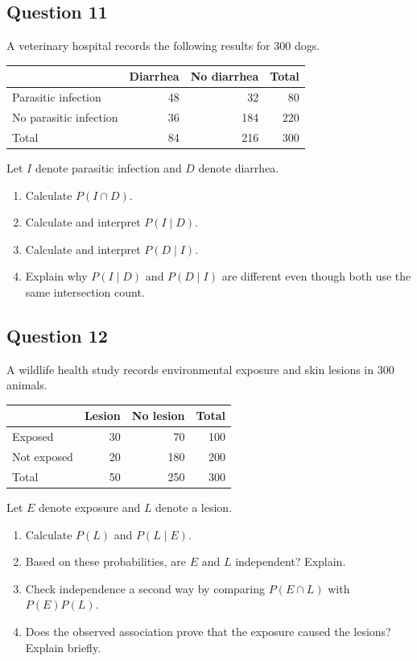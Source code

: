 \documentclass[10pt,letterpaper]{article}
\newcommand{\questionheading}[1]{%
  \subsection*{Question #1}
}
\begin{document}
\questionheading{11}
A veterinary hospital records the following results for 300 dogs.
\begin{center}
\begin{tabular}{lrrr}
\toprule
	& Diarrhea & No diarrhea & Total \\
\midrule
Parasitic infection & 48 & 32 & 80 \\
No parasitic infection & 36 & 184 & 220 \\
\midrule
Total & 84 & 216 & 300 \\
\bottomrule
\end{tabular}
\end{center}

Let $I$ denote parasitic infection and $D$ denote diarrhea.
\begin{enumerate}
	\item Calculate $P(I\cap D)$.	
	\item Calculate and interpret $P(I\mid D)$.
	\item Calculate and interpret $P(D\mid I)$.
	\item Explain why $P(I\mid D)$ and $P(D\mid I)$ are different even though both use the same intersection count.
\end{enumerate}

\newpage

\questionheading{12}
A wildlife health study records environmental exposure and skin lesions in 300 animals.
\begin{center}
\begin{tabular}{lrrr}
\toprule
	& Lesion & No lesion & Total \\
\midrule
Exposed & 30 & 70 & 100 \\
Not exposed & 20 & 180 & 200 \\
\midrule
Total & 50 & 250 & 300 \\
\bottomrule
\end{tabular}
\end{center}
Let $E$ denote exposure and $L$ denote a lesion.
\begin{enumerate}
	\item Calculate $P(L)$ and $P(L\mid E)$.
	\item Based on these probabilities, are $E$ and $L$ independent? Explain.
	\item Check independence a second way by comparing $P(E\cap L)$ with $P(E)P(L)$.
	\item Does the observed association prove that the exposure caused the lesions? Explain briefly.
\end{enumerate}
\end{document}
